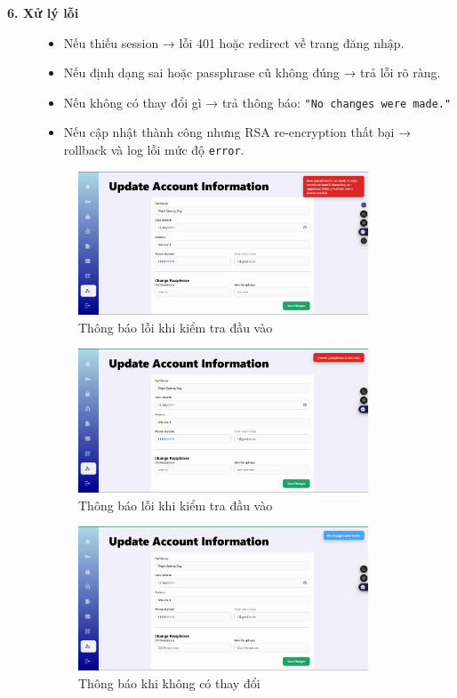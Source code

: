 \begin{description}
    \item[\textbf{6. Xử lý lỗi}]
    \begin{itemize}
        \item Nếu thiếu session → lỗi 401 hoặc redirect về trang đăng nhập.
        \item Nếu định dạng sai hoặc passphrase cũ không đúng → trả lỗi rõ ràng.
        \item Nếu không có thay đổi gì → trả thông báo: \texttt{"No changes were made."}
        \item Nếu cập nhật thành công nhưng RSA re-encryption thất bại → rollback và log lỗi mức độ \texttt{error}.
    \end{itemize}

    
    \begin{figure}[H]
        \centering
        \includegraphics[width=0.85\textwidth]{img/5_update/5_update_fail_1.png}
        \caption{Thông báo lỗi khi kiểm tra đầu vào}
    \end{figure}

    \begin{figure}[H]
        \centering
        \includegraphics[width=0.85\textwidth]{img/5_update/5_update_fail_2.png}
        \caption{Thông báo lỗi khi kiểm tra đầu vào}
    \end{figure}

    \begin{figure}[H]
        \centering
        \includegraphics[width=0.85\textwidth]{img/5_update/5_update_no_changes.png}
        \caption{Thông báo khi không có thay đổi}
    \end{figure}
\end{description}
